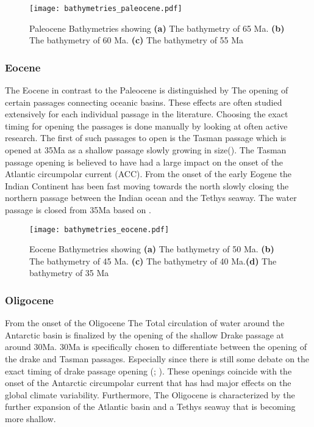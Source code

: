 \begin{figure}[H]
\texttt{[image: bathymetries\_paleocene.pdf]}
\caption{Paleocene Bathymetries showing \textbf{(a)} The bathymetry of 65 Ma. \textbf{(b)} The bathymetry of 60 Ma. \textbf{(c)} The bathymetry of 55 Ma}
\end{figure}

\begin{multicols}{2}
\subsubsection{Eocene}
The Eocene in contrast to the Paleocene is distinguished by The opening of certain passages connecting oceanic basins. These effects are often studied extensively for each individual passage in the literature. Choosing the exact timing for opening the passages is done manually by looking at often active research. The first of such passages to open is the Tasman passage which is opened at 35Ma as a shallow passage slowly growing in size(\cite{Lawver2003Sep}). The Tasman passage opening is believed to have had a large impact on the onset of the Atlantic circumpolar current (ACC).
From the onset of the early Eogene the Indian Continent has been fast moving towards the north slowly closing the northern passage between the Indian ocean and the Tethys seaway. The water passage is closed from 35Ma based on \cite{Najman2010Dec}.
\end{multicols}

\begin{figure}[H]
\texttt{[image: bathymetries\_eocene.pdf]}
\caption{Eocene Bathymetries showing \textbf{(a)} The bathymetry of 50 Ma. \textbf{(b)} The bathymetry of 45 Ma. \textbf{(c)} The bathymetry of 40 Ma.\textbf{(d)} The bathymetry of 35 Ma}
\end{figure}

\begin{multicols}{2}
\subsubsection{Oligocene}
From the onset of the Oligocene The Total circulation of water around the Antarctic basin is finalized by the opening of the shallow Drake passage at around 30Ma. 30Ma is specifically chosen to differentiate between the opening of the drake and Tasman passages. Especially since there is still some debate on the exact timing of drake passage opening (\cite{Scher2006Apr}; \cite{Livermore2005Jul}). These openings coincide with the onset of the Antarctic circumpolar current that has had major effects on the global climate variability. Furthermore, The Oligocene is characterized by the further expansion of the Atlantic basin and a Tethys seaway that is becoming more shallow. 
\end{multicols}

